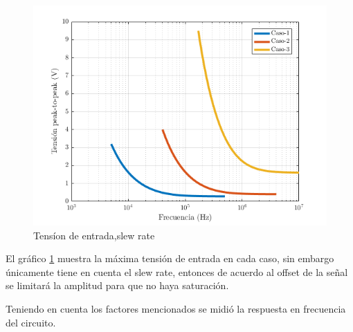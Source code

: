 \documentclass[../../main.tex]{subfiles}
\begin{document}
\begin{figure}[H]
\centering
\includegraphics[width=1\textwidth]{imagenes/slew-rate-inv.png}
\caption{Tens\'ion de entrada,slew rate} \label{fig=srInv}
\end{figure}

El gr\'afico \ref{fig=srInv}  muestra la máxima tensión de entrada en cada caso, sin embargo únicamente tiene en cuenta el slew rate, entonces de acuerdo al offset de la señal se limitar\'a la amplitud para que no haya saturación.\par

Teniendo en cuenta los factores mencionados se midió la respuesta en frecuencia del circuito.
\end{document}

